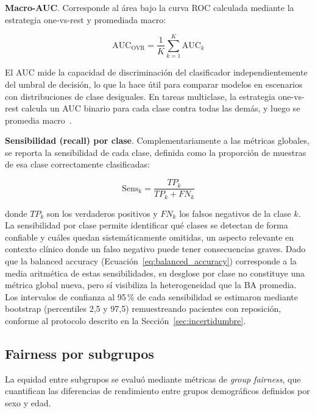 \textbf{Macro-AUC}. Corresponde al área bajo la curva ROC calculada mediante la estrategia one-vs-rest y promediada macro:

\begin{equation}
    \text{AUC}_{\text{OVR}} = \frac{1}{K} \sum_{k=1}^{K} \text{AUC}_k
    \label{eq:macro_auc}
\end{equation}

El AUC mide la capacidad de discriminación del clasificador independientemente del umbral de decisión, lo que la hace útil para comparar modelos en escenarios con distribuciones de clase desiguales. En tareas multiclase, la estrategia one-vs-rest calcula un AUC binario para cada clase contra todas las demás, y luego se promedia macro~\parencite{NEURIPS2024_c9826b9e}.

\textbf{Sensibilidad (recall) por clase}. Complementariamente a las métricas globales, se reporta la sensibilidad de cada clase, definida como la proporción de muestras de esa clase correctamente clasificadas:

\begin{equation}
    \text{Sens}_k = \frac{TP_k}{TP_k + FN_k}
    \label{eq:sensibilidad}
\end{equation}

donde $TP_k$ son los verdaderos positivos y $FN_k$ los falsos negativos de la clase $k$. La sensibilidad por clase permite identificar qué clases se detectan de forma confiable y cuáles quedan sistemáticamente omitidas, un aspecto relevante en contexto clínico donde un falso negativo puede tener consecuencias graves. Dado que la balanced accuracy (Ecuación~\ref{eq:balanced_accuracy}) corresponde a la media aritmética de estas sensibilidades, su desglose por clase no constituye una métrica global nueva, pero sí visibiliza la heterogeneidad que la BA promedia. Los intervalos de confianza al 95\,\% de cada sensibilidad se estimaron mediante bootstrap (percentiles 2,5 y 97,5) remuestreando pacientes con reposición, conforme al protocolo descrito en la Sección~\ref{sec:incertidumbre}.

\subsection{Fairness por subgrupos}
\label{sec:fairness_subgrupos}

La equidad entre subgrupos se evaluó mediante métricas de \textit{group fairness}, que cuantifican las diferencias de rendimiento entre grupos demográficos definidos por sexo y edad.

